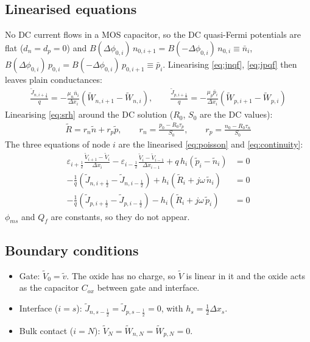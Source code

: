 \documentclass[11pt]{article}
\newcommand{\dphi}[1]{\Delta\phi_{#1}}
\newcommand{\half}{\tfrac{1}{2}}
\begin{document}
\subsection{Linearised equations}
No DC current flows in a MOS capacitor, so the DC quasi-Fermi potentials are flat ($d_n=d_p=0$) and
$B(\dphi{0,i})\,n_{0,i+1}=B(-\dphi{0,i})\,n_{0,i}\equiv\bar n_i$,
$B(\dphi{0,i})\,p_{0,i}=B(-\dphi{0,i})\,p_{0,i+1}\equiv\bar p_i$.
Linearising \eqref{eq:jnqf}, \eqref{eq:jpqf} then leaves plain conductances:
\begin{align}
\frac{\tilde J_{n,i+\half}}{q}=-\frac{\mu_n\bar n_i}{\Delta x_i}\left(\tilde W_{n,i+1}-\tilde W_{n,i}\right),\qquad
\frac{\tilde J_{p,i+\half}}{q}=-\frac{\mu_p\bar p_i}{\Delta x_i}\left(\tilde W_{p,i+1}-\tilde W_{p,i}\right)
\end{align}
Linearising \eqref{eq:srh} around the DC solution ($R_0$, $S_0$ are the DC values):
\begin{align}
\tilde R=r_n\tilde n+r_p\tilde p,\qquad r_n=\frac{p_0-R_0\tau_p}{S_0},\qquad r_p=\frac{n_0-R_0\tau_n}{S_0}
\end{align}
The three equations of node $i$ are the linearised \eqref{eq:poisson} and \eqref{eq:continuity}:
\begin{align}
\varepsilon_{i+\half}\frac{\tilde V_{i+1}-\tilde V_i}{\Delta x_i}-\varepsilon_{i-\half}\frac{\tilde V_i-\tilde V_{i-1}}{\Delta x_{i-1}}
+q\,h_i\left(\tilde p_i-\tilde n_i\right)&=0 \label{eq:poissonac}\\
-\frac1q\left(\tilde J_{n,i+\half}-\tilde J_{n,i-\half}\right)+h_i\left(\tilde R_i+j\omega\,\tilde n_i\right)&=0 \label{eq:nac}\\
-\frac1q\left(\tilde J_{p,i+\half}-\tilde J_{p,i-\half}\right)-h_i\left(\tilde R_i+j\omega\,\tilde p_i\right)&=0 \label{eq:pac}
\end{align}
$\phi_{ms}$ and $Q_f$ are constants, so they do not appear.

\subsection{Boundary conditions}
\begin{itemize}
\item Gate: $\tilde V_0=\tilde v$. The oxide has no charge, so $\tilde V$ is linear in it and the oxide acts as
the capacitor $C_{ox}$ between gate and interface.
\item Interface ($i=s$): $\tilde J_{n,s-\half}=\tilde J_{p,s-\half}=0$, with $h_s=\half\Delta x_s$.
\item Bulk contact ($i=N$): $\tilde V_N=\tilde W_{n,N}=\tilde W_{p,N}=0$.
\end{itemize}
\end{document}
